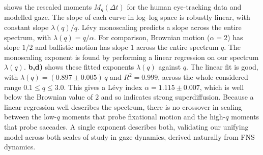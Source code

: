  shows the rescaled moments $M_q(\Delta t)$ for the human eye-tracking data and modelled gaze. The slope of each curve in log--log space is robustly linear, with constant slope $\lambda(q)/q$. Lévy monoscaling predicts a slope across the entire spectrum, with $\lambda(q) = q/\alpha$. For comparison, Brownian motion ($\alpha = 2$) has slope $1/2$ and ballistic motion has slope $1$ across the entire spectrum $q$. The monoscaling exponent is found by performing a linear regression on our spectrum $\lambda(q)$. \textbf{b,d)} shows these fitted exponents $\lambda(q)$ against $q$. The linear fit is good, with $\lambda(q) = (0.897 \pm 0.005)\,q$ and $R^2 = 0.999$, across the whole considered range $0.1 \le q \le 3.0$. This gives a Lévy index $\alpha = 1.115 \pm 0.007$, which is well below the Brownian value of $2$ and so indicates strong superdiffusion. Because a linear regression well describes the spectrum, there is no crossover in scaling between the low-$q$ moments that probe fixational motion and the high-$q$ moments that probe saccades. A single exponent describes both, validating our unifying model across both scales of study in gaze dynamics, derived naturally from FNS dynamics.
